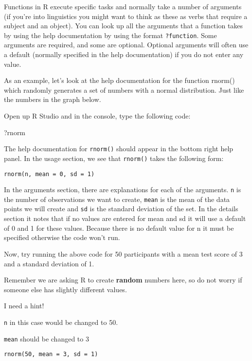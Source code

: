 \documentclass[]{book}
\newenvironment{Shaded}{\begin{snugshade}}{\end{snugshade}}
\newcommand{\NormalTok}[1]{#1}
\begin{document}
Functions in R execute specific tasks and normally take a number of arguments (if you're into linguistics you might want to think as these as verbs that require a subject and an object). You can look up all the arguments that a function takes by using the help documentation by using the format \texttt{?function}. Some arguments are required, and some are optional. Optional arguments will often use a default (normally specified in the help documentation) if you do not enter any value.

As an example, let's look at the help documentation for the function rnorm() which randomly generates a set of numbers with a normal distribution. Just like the numbers in the graph below.

Open up R Studio and in the console, type the following code:

\begin{Shaded}
\begin{Highlighting}[]
\NormalTok{?rnorm}
\end{Highlighting}
\end{Shaded}

The help documentation for \texttt{rnorm()} should appear in the bottom right help panel. In the usage section, we see that \texttt{rnorm()} takes the following form:

\begin{verbatim}
rnorm(n, mean = 0, sd = 1)
\end{verbatim}

In the arguments section, there are explanations for each of the arguments. \texttt{n} is the number of observations we want to create, \texttt{mean} is the mean of the data points we will create and \texttt{sd} is the standard deviation of the set. In the details section it notes that if no values are entered for mean and sd it will use a default of 0 and 1 for these values. Because there is no default value for n it must be specified otherwise the code won't run.

Now, try running the above code for 50 participants with a mean test score of 3 and a standard deviation of 1.

Remember we are asking R to create \textbf{random} numbers here, so do not worry if someone else has slightly different values.

I need a hint!

\texttt{n} in this case would be changed to 50.

\texttt{mean} should be changed to 3

\texttt{rnorm(50,\ mean\ =\ 3,\ sd\ =\ 1)}
\end{document}
